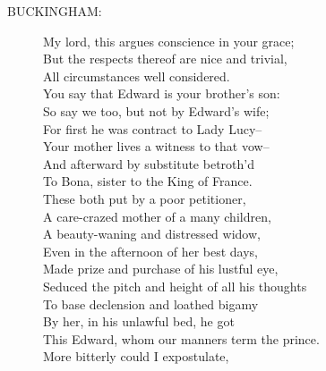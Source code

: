 \documentclass{article}
\begin{document}
\begin{description}
\item[BUCKINGHAM:] 
\hspace{1pt}My lord, this argues conscience in your grace;\\
\hspace{1pt}But the respects thereof are nice and trivial,\\
\hspace{1pt}All circumstances well considered.\\
\hspace{1pt}You say that Edward is your brother's son:\\
\hspace{1pt}So say we too, but not by Edward's wife;\\
\hspace{1pt}For first he was contract to Lady Lucy--\\
\hspace{1pt}Your mother lives a witness to that vow--\\
\hspace{1pt}And afterward by substitute betroth'd\\
\hspace{1pt}To Bona, sister to the King of France.\\
\hspace{1pt}These both put by a poor petitioner,\\
\hspace{1pt}A care-crazed mother of a many children,\\
\hspace{1pt}A beauty-waning and distressed widow,\\
\hspace{1pt}Even in the afternoon of her best days,\\
\hspace{1pt}Made prize and purchase of his lustful eye,\\
\hspace{1pt}Seduced the pitch and height of all his thoughts\\
\hspace{1pt}To base declension and loathed bigamy\\
\hspace{1pt}By her, in his unlawful bed, he got\\
\hspace{1pt}This Edward, whom our manners term the prince.\\
\hspace{1pt}More bitterly could I expostulate,\\

\end{description}
\end{document}
